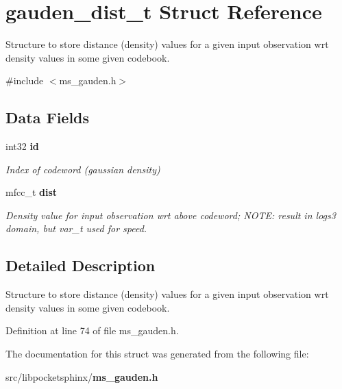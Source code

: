 \section{gauden\-\_\-dist\-\_\-t Struct Reference}
\label{structgauden__dist__t}


Structure to store distance (density) values for a given input observation wrt density values in some given codebook.  




{\ttfamily \#include $<$ms\-\_\-gauden.\-h$>$}

\subsection*{Data Fields}
\begin{DoxyCompactItemize}
\item 
int32 {\bf id}\label{structgauden__dist__t_a93e978149bae5b5bf089769458c42ee4}

\begin{DoxyCompactList}\small\item\em Index of codeword (gaussian density) \end{DoxyCompactList}\item 
mfcc\-\_\-t {\bf dist}\label{structgauden__dist__t_ab08100d4953998dad76bfcf30864c0c5}

\begin{DoxyCompactList}\small\item\em Density value for input observation wrt above codeword; N\-O\-T\-E\-: result in logs3 domain, but var\-\_\-t used for speed. \end{DoxyCompactList}\end{DoxyCompactItemize}


\subsection{Detailed Description}
Structure to store distance (density) values for a given input observation wrt density values in some given codebook. 

Definition at line 74 of file ms\-\_\-gauden.\-h.



The documentation for this struct was generated from the following file\-:\begin{DoxyCompactItemize}
\item 
src/libpocketsphinx/{\bf ms\-\_\-gauden.\-h}\end{DoxyCompactItemize}
